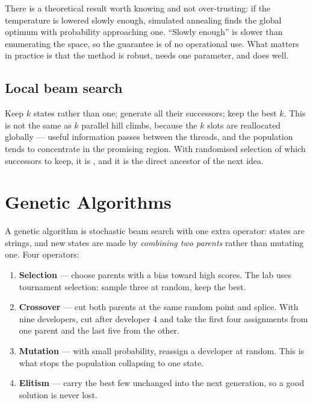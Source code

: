 There is a theoretical result worth knowing and not over-trusting: if the
temperature is lowered slowly enough, simulated annealing finds the global optimum
with probability approaching one. ``Slowly enough'' is slower than enumerating the
space, so the guarantee is of no operational use. What matters in practice is that
the method is robust, needs one parameter, and does well.

\subsection{Local beam search}

Keep $k$ states rather than one; generate all their successors; keep the best $k$.
This is not the same as $k$ parallel hill climbs, because the $k$ slots are
reallocated globally --- useful information passes between the threads, and the
population tends to concentrate in the promising region. With randomised selection
of which successors to keep, it is , and it is the
direct ancestor of the next idea.

\section{Genetic Algorithms}

A genetic algorithm is stochastic beam search with one extra operator: states are
strings, and new states are made by \emph{combining two parents} rather than
mutating one. Four operators:

\begin{enumerate}[leftmargin=2.2em, itemsep=2pt, topsep=4pt]
  \item \textbf{Selection} --- choose parents with a bias toward high scores. The
        lab uses tournament selection: sample three at random, keep the best.
  \item \textbf{Crossover} --- cut both parents at the same random point and splice.
        With nine developers, cut after developer $4$ and take the first four
        assignments from one parent and the last five from the other.
  \item \textbf{Mutation} --- with small probability, reassign a developer at
        random. This is what stops the population collapsing to one state.
  \item \textbf{Elitism} --- carry the best few unchanged into the next generation,
        so a good solution is never lost.
\end{enumerate}


